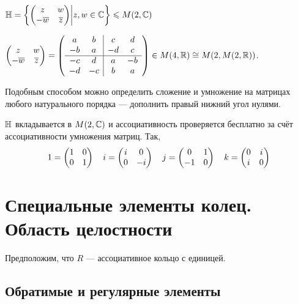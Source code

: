 \documentclass[a4paper]{report}
\begin{document}
    $\mathbb{H} = \left\{\begin{pmatrix}z &w\\-\overline{w}&\overline{z}\end{pmatrix}\middle|z, w \in \mathbb{C}\right\} \leqslant M(2, \mathbb{C})$

    $\begin{pmatrix}z&w\\-\overline{w}&\overline{z}\end{pmatrix} =\left(
    \begin{array}{c c|c c}
        a  & b  & c  & d  \\
        -b & a  & -d & c  \\
        \hline
        -c & d  & a  & -b \\
        -d & -c & b  & a
    \end{array}
    \right)\in M(4, \mathbb{R}) \cong M(2, M(2, \mathbb{R}))$.


    Подобным способом можно определить сложение и умножение на матрицах любого натурального порядка --- дополнить правый нижний угол нулями.

    $\mathbb{H}$ вкладывается в $M(2, \mathbb{C})$ и ассоциативность проверяется бесплатно за счёт ассоциативности умножения матриц.
    Так, \[1 = \begin{pmatrix}1&0\\0&1\end{pmatrix}\quad i = \begin{pmatrix}i&0\\0&-i\end{pmatrix}\quad j = \begin{pmatrix}0&1\\-1&0\end{pmatrix}\quad k = \begin{pmatrix}0 & i\\i & 0\end{pmatrix}\]



    \section{Специальные элементы колец. Область целостности}

    Предположим, что $R$ --- ассоциативное кольцо с единицей.

    \subsection{Обратимые и регулярные элементы}


\end{document}
